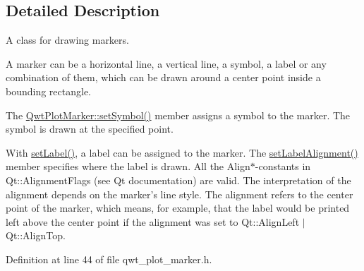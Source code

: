 \subsection{Detailed Description}
A class for drawing markers. 

A marker can be a horizontal line, a vertical line, a symbol, a label or any combination of them, which can be drawn around a center point inside a bounding rectangle.

The \hyperlink{class_qwt_plot_marker_af44231c2b63bb277706e4f515297c7b1}{Qwt\-Plot\-Marker\-::set\-Symbol()} member assigns a symbol to the marker. The symbol is drawn at the specified point.

With \hyperlink{class_qwt_plot_marker_ad90adc27ccd6a10a7d6d1bb4464bf7d1}{set\-Label()}, a label can be assigned to the marker. The \hyperlink{class_qwt_plot_marker_ab0c88d103cc68093ac7469ad421105e0}{set\-Label\-Alignment()} member specifies where the label is drawn. All the Align$\ast$-\/constants in Qt\-::\-Alignment\-Flags (see Qt documentation) are valid. The interpretation of the alignment depends on the marker's line style. The alignment refers to the center point of the marker, which means, for example, that the label would be printed left above the center point if the alignment was set to Qt\-::\-Align\-Left $|$ Qt\-::\-Align\-Top. 

Definition at line 44 of file qwt\-\_\-plot\-\_\-marker.\-h.



